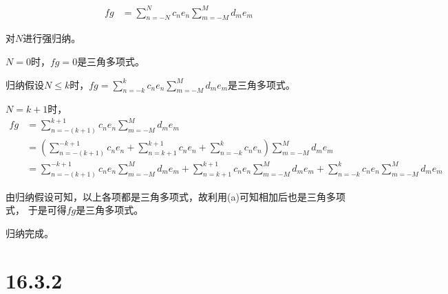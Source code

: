 \documentclass{article}
\begin{document}
\begin{itemize}
        \begin{align*}
          fg & = \sum \limits_{n = - N}^N c_n e_n \sum \limits_{m = - M}^M d_{m} e_m
        \end{align*}

        对$N$进行强归纳。

        $N = 0$时，$fg = 0$是三角多项式。

        归纳假设$N \leq k$时，$fg = \sum \limits_{n = - k}^k c_n e_n \sum \limits_{m = - M}^M d_{m} e_m$是三角多项式。

        $N = k + 1$时，
        \begin{align*}
          fg & = \sum \limits_{n = - (k + 1)}^{k + 1} c_n e_n \sum \limits_{m = - M}^M d_{m} e_m   \\
             & = \left(\sum \limits_{n = - (k + 1)}^{-{k + 1}} c_ne_n
          + \sum \limits_{n = k + 1}^{k + 1} c_ne_n
          + \sum \limits_{n = - k}^k c_n e_n\right)\sum \limits_{m = - M}^M d_{m} e_m              \\
             & = \sum \limits_{n = - (k + 1)}^{-{k + 1}} c_ne_n \sum \limits_{m = - M}^M d_{m} e_m
          + \sum \limits_{n = k + 1}^{k + 1} c_ne_n \sum \limits_{m = - M}^M d_{m} e_m
          + \sum \limits_{n = - k}^k c_n e_n \sum \limits_{m = - M}^M d_{m} e_m
        \end{align*}

        由归纳假设可知，以上各项都是三角多项式，故利用(a)可知相加后也是三角多项式，
        于是可得$fg$是三角多项式。

        归纳完成。

\end{itemize}

\section*{16.3.2}
\end{document}
